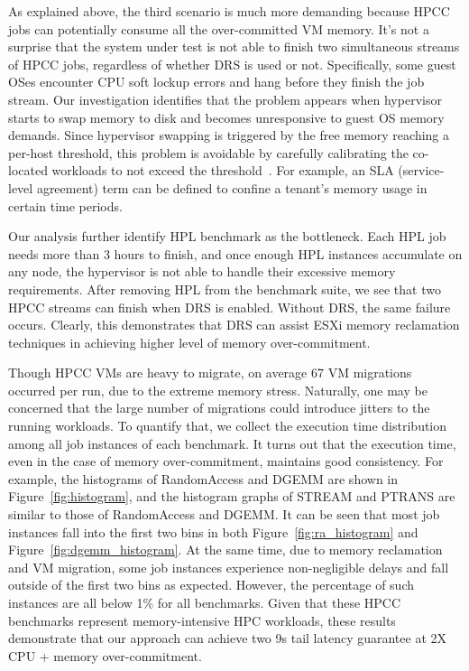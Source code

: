 As explained above, the third scenario is much more demanding because HPCC jobs can potentially consume all the over-committed VM memory. It's not a surprise that the system under test is not able to finish two simultaneous streams of HPCC jobs, regardless of whether DRS is used or not. Specifically, some guest OSes encounter CPU soft lockup errors and hang before they finish the job stream. Our investigation identifies that the problem appears when hypervisor starts to swap memory to disk and becomes unresponsive to guest OS memory demands. Since hypervisor swapping 
is triggered by the free memory reaching a per-host threshold, this problem is avoidable by carefully calibrating the co-located workloads to not exceed the threshold~\cite{banerjee2013memory}. For example, an SLA (service-level agreement) term can be defined to confine a tenant's memory usage in certain time periods. 

Our analysis further identify HPL benchmark as the bottleneck. Each HPL job needs more than 3 hours to finish, and once enough HPL instances accumulate on any node, the hypervisor is not able to handle their excessive memory requirements. After removing HPL from the benchmark suite, we see that two HPCC streams can finish when DRS is enabled. Without DRS, the same failure occurs. Clearly, this demonstrates that DRS can assist ESXi memory reclamation techniques in achieving higher level of memory over-commitment. 

Though HPCC VMs are heavy to migrate, on average 67 VM migrations occurred per run, due to the extreme memory stress. Naturally, one may be concerned that the large number of migrations could introduce jitters to the running workloads. To quantify that, we collect the execution time distribution among all job instances of each benchmark. It turns out that the execution time, even in the case of memory over-commitment, maintains good consistency. For example, the histograms of RandomAccess and DGEMM are shown in Figure~\ref{fig:histogram}, and the histogram graphs of STREAM and PTRANS are similar to those of RandomAccess and DGEMM. It can be seen that most job instances fall into the first two bins in both Figure~\ref{fig:ra_histogram} and Figure~\ref{fig:dgemm_histogram}. At the same time, due to memory reclamation and VM migration, some job instances experience non-negligible delays and fall outside of the first two bins as expected. However, the percentage of such instances are all below 1\% for all benchmarks. Given that these HPCC benchmarks represent memory-intensive HPC workloads, these results demonstrate that our approach can achieve two 9s tail latency guarantee at 2X CPU + memory over-commitment. 


